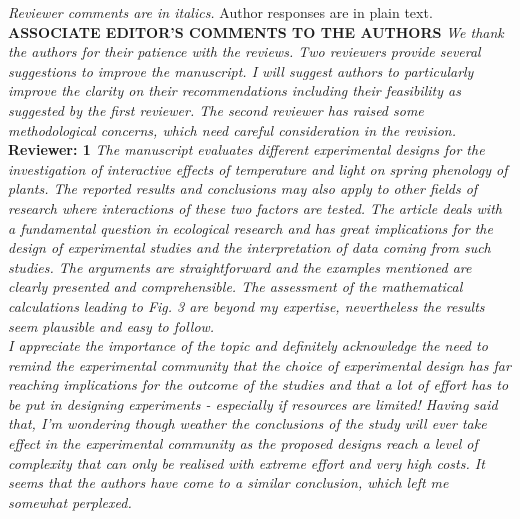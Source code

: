 \documentclass[11pt]{article}
\begin{document}
\emph{Reviewer comments are in italics.} Author responses are in plain text.\\


\textbf{ASSOCIATE EDITOR'S COMMENTS TO THE AUTHORS}
\emph{We thank the authors for their patience with the reviews. Two reviewers provide several suggestions to improve the manuscript. I will suggest authors to particularly improve the clarity on their recommendations including their feasibility as suggested by the first reviewer. The second reviewer has raised some methodological concerns, which need careful consideration in the revision.}\\

\textbf{Reviewer: 1}
\emph{The manuscript evaluates different experimental designs for the investigation of interactive effects of temperature and light on spring phenology of plants. The reported results and conclusions may also apply to other fields of research where interactions of these two factors are tested. The article deals with a fundamental question in ecological research and has great implications for the design of experimental studies and the interpretation of data coming from such studies. The arguments are straightforward and the examples mentioned are clearly presented and comprehensible. The assessment of the mathematical calculations leading to Fig. 3 are beyond my expertise, nevertheless the results seem plausible and easy to follow.}\\

\emph{I appreciate the importance of the topic and definitely acknowledge the need to remind the experimental community that the choice of experimental design has far reaching implications for the outcome of the studies and that a lot of effort has to be put in designing experiments - especially if resources are limited! Having said that, I’m wondering though weather the conclusions of the study will ever take effect in the experimental community as the proposed designs reach a level of complexity that can only be realised with extreme effort and very high costs. It seems that the authors have come to a similar conclusion, which left me somewhat perplexed.}\\
\end{document}
